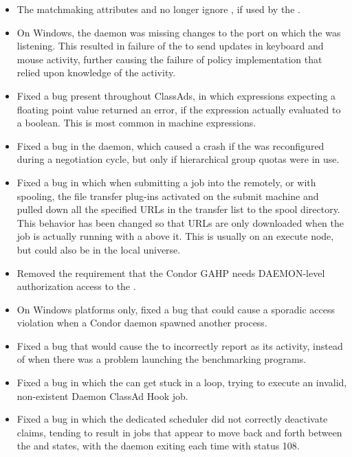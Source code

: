 \begin{itemize}
\item The matchmaking attributes 
 and  
no longer ignore , if used by the .

\item On Windows, the  daemon was missing changes to the
port on which the  was listening.
This resulted in failure of the  to send updates in 
keyboard and mouse activity,
further causing the failure of policy implementation that relied upon 
knowledge of the activity.

\item Fixed a bug present throughout ClassAds,
in which expressions expecting a floating point value returned an error,
if the expression actually evaluated to a boolean.
This is most common in machine  expressions.

\item Fixed a bug in the  daemon,
which caused a crash if the  was reconfigured 
during a negotiation cycle, 
but only if hierarchical group quotas were in use.

\item Fixed a bug in which when submitting a job into the 
remotely, or with spooling, 
the file transfer plug-ins activated on the submit machine 
and pulled down all the specified URLs in the transfer list 
to the spool directory. 
This behavior has been changed so that URLs are only downloaded 
when the job is actually running with a  above it. 
This is usually on an execute node, but could also be in the local universe. 

\item Removed the requirement that the Condor GAHP needs DAEMON-level 
authorization access to the . 

\item On Windows platforms only, 
fixed a bug that could cause a sporadic access violation 
when a Condor daemon spawned another process.

\item Fixed a bug that would cause the  to 
incorrectly report  as its activity, instead of 
when there was a problem launching the benchmarking programs. 

\item Fixed a bug in which the  can get stuck in a loop,
trying to execute an invalid, non-existent Daemon ClassAd Hook job. 

\item Fixed a bug in which the dedicated scheduler did not correctly 
deactivate claims,
tending to result in jobs that appear to move back and forth between
the  and  states,
with the  daemon exiting each time with status 108.

\end{itemize}


